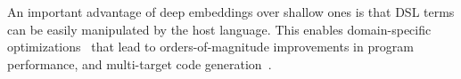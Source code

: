 An important advantage of deep embeddings over shallow ones is that DSL
  terms can be easily manipulated by the host language. This enables domain-specific
  optimizations~\cite{rompf_lightweight_2012,rompf_optimizing_2013}
  that lead to orders-of-magnitude improvements in program performance, and
  multi-target code generation~\cite{brown_heterogeneous_2011}.




















%
%

%
%


%
%



